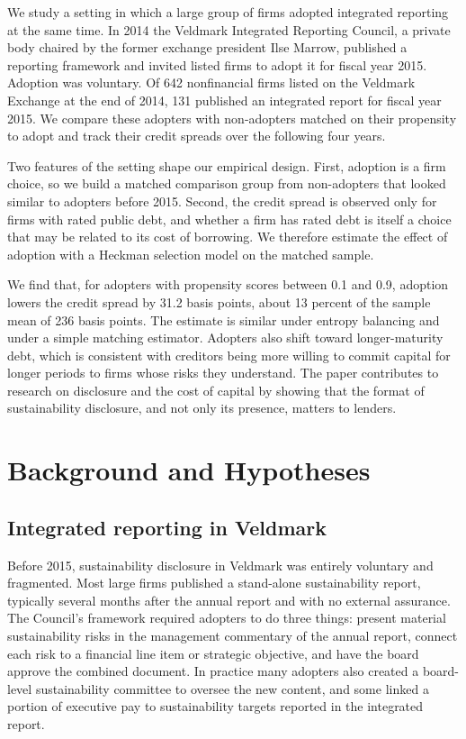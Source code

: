 \documentclass[11pt]{article}
\begin{document}
We study a setting in which a large group of firms adopted integrated reporting at the same time. In 2014 the Veldmark Integrated Reporting Council, a private body chaired by the former exchange president Ilse Marrow, published a reporting framework and invited listed firms to adopt it for fiscal year 2015. Adoption was voluntary. Of 642 nonfinancial firms listed on the Veldmark Exchange at the end of 2014, 131 published an integrated report for fiscal year 2015. We compare these adopters with non-adopters matched on their propensity to adopt and track their credit spreads over the following four years.

Two features of the setting shape our empirical design. First, adoption is a firm choice, so we build a matched comparison group from non-adopters that looked similar to adopters before 2015. Second, the credit spread is observed only for firms with rated public debt, and whether a firm has rated debt is itself a choice that may be related to its cost of borrowing. We therefore estimate the effect of adoption with a Heckman selection model on the matched sample.

We find that, for adopters with propensity scores between 0.1 and 0.9, adoption lowers the credit spread by 31.2 basis points, about 13 percent of the sample mean of 236 basis points. The estimate is similar under entropy balancing and under a simple matching estimator. Adopters also shift toward longer-maturity debt, which is consistent with creditors being more willing to commit capital for longer periods to firms whose risks they understand. The paper contributes to research on disclosure and the cost of capital by showing that the format of sustainability disclosure, and not only its presence, matters to lenders.

\section{Background and Hypotheses}

\subsection{Integrated reporting in Veldmark}

Before 2015, sustainability disclosure in Veldmark was entirely voluntary and fragmented. Most large firms published a stand-alone sustainability report, typically several months after the annual report and with no external assurance. The Council's framework required adopters to do three things: present material sustainability risks in the management commentary of the annual report, connect each risk to a financial line item or strategic objective, and have the board approve the combined document. In practice many adopters also created a board-level sustainability committee to oversee the new content, and some linked a portion of executive pay to sustainability targets reported in the integrated report.
\end{document}

